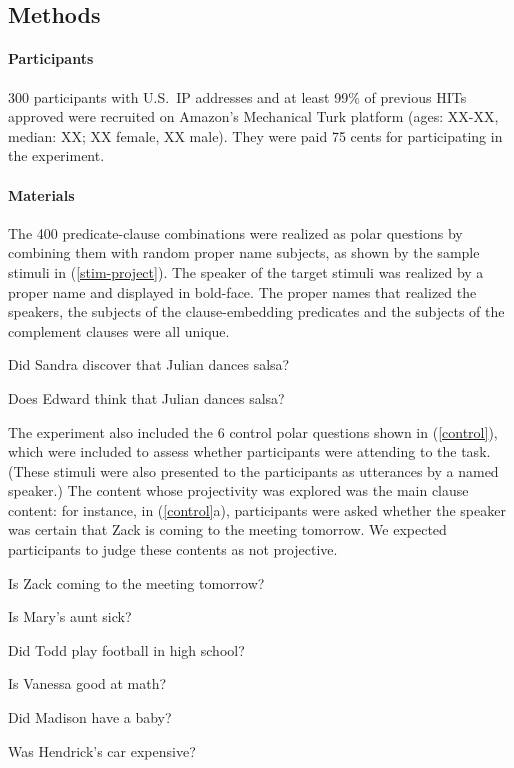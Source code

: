 \documentclass[11pt,fleqn]{article}
\newcommand{\6}{\mbox{$[\hspace*{-.6mm}[$}}
\newcommand{\9}{\mbox{$]\hspace*{-.6mm}]$}}
\begin{document}
\subsection{Methods}

\paragraph{Participants} 300 participants with U.S.\ IP addresses and at least 99\% of previous HITs approved were recruited on Amazon's Mechanical Turk platform (ages: XX-XX, median: XX; XX female, XX male). They were paid 75 cents for participating in the experiment.

\paragraph{Materials} The 400 predicate-clause combinations were realized as polar questions by combining them with random proper name subjects, as shown by the sample stimuli in (\ref{stim-project}).  The speaker of the target stimuli was realized by a proper name and displayed in bold-face. The proper names that realized the speakers, the subjects of the clause-embedding predicates and the subjects of the complement clauses were all unique.

\begin{exe}
\ex\label{stim-project} 
\begin{xlist}
 Did Sandra discover that Julian dances salsa?

 Does Edward think that Julian dances salsa?
\end{xlist}
\end{exe}

The experiment also included the 6 control polar questions shown in (\ref{control}), which were included to assess whether participants were attending to the task. (These stimuli were also presented to the participants as utterances by a named speaker.) The content whose projectivity was explored was the main clause content: for instance, in (\ref{control}a), participants were asked whether the speaker was certain that Zack is coming to the meeting tomorrow. We expected participants to judge these contents as not projective.

\begin{exe}
\ex\label{control} 
\begin{xlist}

\ex   Is Zack coming to the meeting tomorrow?

\ex Is Mary's aunt sick?

\ex Did Todd play football in high school?

\ex Is Vanessa good at math?

\ex Did Madison have a baby?

\ex Was Hendrick's car expensive?

\end{xlist}
\end{exe}
\end{document}
